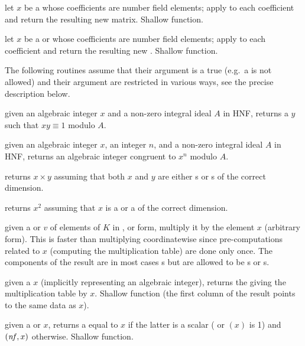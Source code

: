  let $x$ be a  whose coefficients
are number field elements; apply  to each
coefficient and return the resulting new matrix. Shallow function.

 let $x$ be a  or
 whose coefficients
are number field elements; apply  to each
coefficient and return the resulting new . Shallow function.

 The following routines assume that their 
argument is a true  (e.g.~a  is not allowed) and their
argument are restricted in various ways, see the precise description below.

 given an algebraic integer
$x$ and a non-zero integral ideal $A$ in HNF, returns a $y$ such that
$xy \equiv 1$ modulo $A$.

 given an algebraic
integer $x$, an integer $n$, and a non-zero integral ideal $A$ in HNF,
returns an algebraic integer congruent to $x^n$ modulo $A$.

 returns $x\times y$ assuming
that both $x$ and $y$ are either s or s of the correct
dimension.

 returns $x^2$ assuming that $x$ is a 
or a  of the correct dimension.

 given a  or 
$v$ of elements of $K$ in ,  or  form, multiply
it by the element $x$ (arbitrary form). This is faster than multiplying
coordinatewise since pre-computations related to $x$ (computing the
multiplication table) are done only once. The components of the result
are in most cases s but are allowed to be s or s.

 given a  $x$ (implicitly
representing an algebraic integer), returns the  giving the
multiplication table by $x$. Shallow function (the first column of the result
points to the same data as $x$).

 given a  or 
$x$, returns a  equal to $x$ if the latter is a scalar
( or $(x)$ is 1) and
$(\hbox{\it nf\/},x)$ otherwise. Shallow function.


